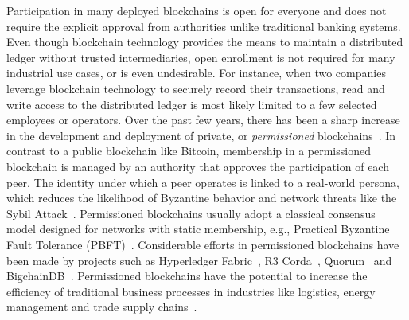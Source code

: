 Participation in many deployed blockchains is open for everyone and does not require the explicit approval from authorities unlike traditional banking systems.
Even though blockchain technology provides the means to maintain a distributed ledger without trusted intermediaries, open enrollment is not required for many industrial use cases, or is even undesirable.
For instance, when two companies leverage blockchain technology to securely record their transactions, read and write access to the distributed ledger is most likely limited to a few selected employees or operators.
Over the past few years, there has been a sharp increase in the development and deployment of private, or \emph{permissioned} blockchains~\cite{androulaki2018hyperledger,de2018pbft,vukolic2017rethinking}.
In contrast to a public blockchain like Bitcoin, membership in a permissioned blockchain is managed by an authority that approves the participation of each peer.
The identity under which a peer operates is linked to a real-world persona, which reduces the likelihood of Byzantine behavior and network threats like the Sybil Attack~\cite{douceur2002sybil}.
Permissioned blockchains usually adopt a classical consensus model designed for networks with static membership, e.g., Practical Byzantine Fault Tolerance (PBFT)~\cite{castro1999practical}.
Considerable efforts in permissioned blockchains have been made by projects such as Hyperledger Fabric~\cite{androulaki2018hyperledger}, R3 Corda~\cite{brown2016introducing}, Quorum~\cite{mogan2018quorum} and BigchainDB~\cite{mcconaghy2016bigchaindb}.
Permissioned blockchains have the potential to increase the efficiency of traditional business processes in industries like logistics, energy management and trade supply chains~\cite{vukolic2017rethinking}.

